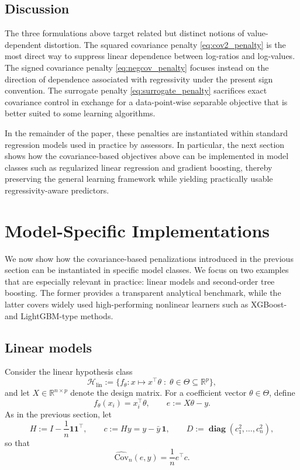\documentclass[12pt, draft]{article}
\theoremstyle{plain}
\theoremstyle{definition}
\newcommand{\R}{\mathbb{R}}
\newcommand{\1}{\mathbf{1}}
\newcommand{\Cov}{\text{Cov}}
\renewcommand{\H}{\mathcal{H}}
\renewcommand{\R}{\mathbb{R}}
\newcommand{\diag}{\mathbf{\operatorname{diag}}}
\begin{document}
\subsection{Discussion}

The three formulations above target related but distinct notions of value-dependent distortion. The squared covariance penalty \eqref{eq:cov2_penalty} is the most direct way to suppress linear dependence between log-ratios and log-values. The signed covariance penalty \eqref{eq:negcov_penalty} focuses instead on the direction of dependence associated with regressivity under the present sign convention. The surrogate penalty \eqref{eq:surrogate_penalty} sacrifices exact covariance control in exchange for a data-point-wise separable objective that is better suited to some learning algorithms.

In the remainder of the paper, these penalties are instantiated within standard regression models used in practice by assessors. In particular, the next section shows how the covariance-based objectives above can be implemented in model classes such as regularized linear regression and gradient boosting, thereby preserving the general learning framework while yielding practically usable regressivity-aware predictors.

\section{Model-Specific Implementations}
\label{sec:model_specific_implementations}

We now show how the covariance-based penalizations introduced in the previous section can be instantiated in specific model classes. We focus on two examples that are especially relevant in practice: linear models and second-order tree boosting. The former provides a transparent analytical benchmark, while the latter covers widely used high-performing nonlinear learners such as XGBoost- and LightGBM-type methods.

\subsection{Linear models}
\label{subsec:linear_models}

Consider the linear hypothesis class
\[
\H_{\mathrm{lin}} := \{f_\theta : x \mapsto x^\top \theta \;:\; \theta \in \Theta \subseteq \R^p\},
\]
and let $X \in \R^{n\times p}$ denote the design matrix. For a coefficient vector $\theta \in \Theta$, define
\[
f_\theta(x_i) = x_i^\top \theta,
\qquad
e := X\theta - y.
\]
As in the previous section, let
\[
H := I - \frac{1}{n}\mathbf{1}\mathbf{1}^\top,
\qquad
c := Hy = y - \bar y\,\mathbf{1},
\qquad
D := \diag(c_1^2,\dots,c_n^2),
\]
so that
\[
\widehat{\Cov}_n(e,y)
=
\frac{1}{n}e^\top c.
\]
\end{document}
